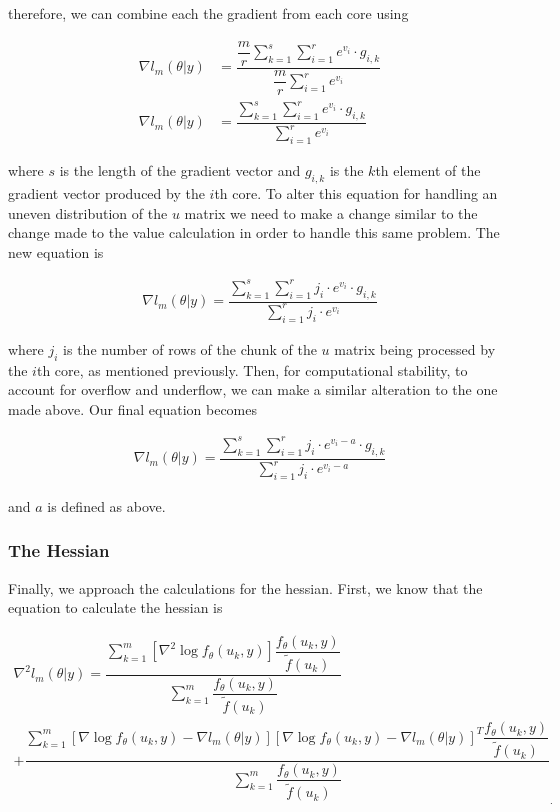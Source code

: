 \documentclass{article}
\begin{document}
\noindent therefore, we can combine each the gradient from each core using

\begin{align}
\nabla l_m(\theta|y) &=\dfrac{\dfrac{m}{r} \sum\limits_{k=1}^s \sum\limits_{i=1}^r e^{v_i} \cdot g_{i,k}}{\dfrac{m}{r} \sum\limits_{i=1}^r e^{v_i}} \\
\nabla l_m(\theta|y) &=\dfrac{ \sum\limits_{k=1}^s \sum\limits_{i=1}^r e^{v_i} \cdot g_{i,k}}{\sum\limits_{i=1}^r e^{v_i}}
\end{align}

\noindent where $s$ is the length of the gradient vector and $g_{i,k}$ is the $k$th element of the gradient vector produced by the $i$th core. To alter this equation for handling an uneven distribution of the $u$ matrix we need to make a change similar to the change made to the value calculation in order to handle this same problem. The new equation is

\begin{align}
\nabla l_m(\theta|y) =\dfrac{\sum\limits_{k=1}^s \sum\limits_{i=1}^r j_i \cdot e^{v_i} \cdot g_{i,k}}{\sum\limits_{i=1}^r j_i \cdot e^{v_i}}
\end{align}

\noindent where $j_i$ is the number of rows of the chunk of the $u$ matrix being processed by the $i$th core, as mentioned previously. Then, for computational stability, to account for overflow and underflow, we can make a similar alteration to the one made above. Our final equation becomes

\begin{align}
\nabla l_m(\theta|y) =\dfrac{\sum\limits_{k=1}^s \sum\limits_{i=1}^r j_i \cdot e^{v_i - a} \cdot g_{i,k}}{\sum\limits_{i=1}^r j_i \cdot e^{v_i - a}}
\end{align}

\noindent and $a$ is defined as above. 

\subsubsection{The Hessian}
Finally, we approach the calculations for the hessian. First, we know that the equation to calculate the hessian is 

\begin{multline}
\nabla^2 l_m(\theta|y)= \dfrac{   \sum_{k=1}^m \left[ \nabla^2 \log f_\theta(u_k,y)     \right]  \dfrac{ f_\theta(u_k,y)}{\tilde{f}(u_k)}  }{\sum_{k=1}^m  \dfrac{ f_\theta(u_k,y)   }{\tilde{f}(u_k)}}\\
+ \dfrac{   \sum_{k=1}^m \left[ \nabla \log f_\theta(u_k,y)  - \nabla l_m(\theta|y)   \right] \left[ \nabla \log f_\theta(u_k,y)  -\nabla l_m(\theta|y)  \right]^T  \dfrac{ f_\theta(u_k,y)   }{\tilde{f}(u_k)}   }{\sum_{k=1}^m  \dfrac{ f_\theta(u_k,y)   }{\tilde{f}(u_k)}}_.
\end{multline}
\end{document}
